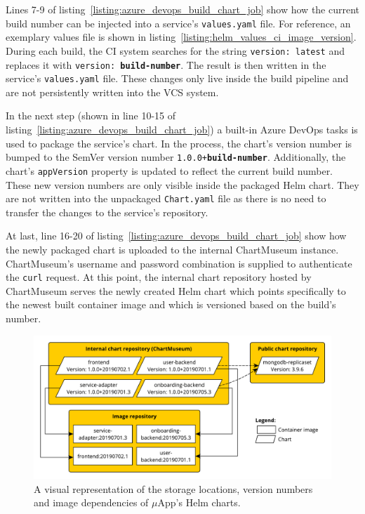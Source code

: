 Lines 7-9 of listing~\ref{listing:azure_devops_build_chart_job} show how the
current build number can be injected into a service's \texttt{values.yaml}
file. For reference, an exemplary values file is shown in
listing~\ref{listing:helm_values_ci_image_version}. During each build, the
\ac{CI} system searches for the string \texttt{version:\textquotedbl
latest\textquotedbl} and replaces it with \texttt{version:\textquotedbl
\textbf{build-number}\textquotedbl}. The result is then written in the
service's \texttt{values.yaml} file. These changes only live inside the build
pipeline and are not persistently written into the \ac{VCS} system.

In the next step (shown in line 10-15 of
listing~\ref{listing:azure_devops_build_chart_job}) a built-in Azure DevOps
tasks is used to package the service's chart. In the process, the chart's
version number is bumped to the SemVer version number
\texttt{1.0.0+\textbf{build-number}}. Additionally, the chart's
\texttt{appVersion} property is updated to reflect the current build number.
These new version numbers are only visible inside the packaged Helm chart. They
are not written into the unpackaged \texttt{Chart.yaml} file as there is no
need to transfer the changes to the service's repository.

At last, line 16-20 of listing~\ref{listing:azure_devops_build_chart_job} show
how the newly packaged chart is uploaded to the internal ChartMuseum instance.
ChartMuseum's username and password combination is supplied to authenticate the
\texttt{curl} request. At this point, the internal chart repository hosted by
ChartMuseum serves the newly created Helm chart which points specifically to
the newest built container image and which is versioned based on the build's
number.

\begin{figure}[H]
\begin{center}
  \includegraphics[scale=0.6]{images/figures/chart_to_image_mapping.pdf}
\end{center}
\caption{A visual representation of the storage locations, version numbers and
image dependencies of $\mu$App's Helm charts.}%
\label{fig:chart_to_image_mapping}
\end{figure}


